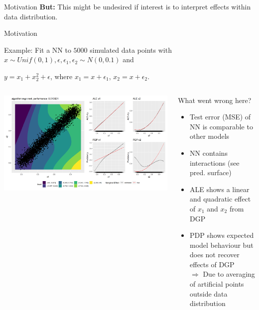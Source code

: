 \documentclass[11pt,compress,t,notes=noshow, aspectratio=169, xcolor=table]{beamer}
\begin{document}
\begin{frame}{Motivation}
\textbf{But:} This might be undesired if interest is to interpret effects within data distribution.



\end{frame}


\begin{frame}{Motivation}


Example: Fit a NN to $5000$ simulated data points with $x \sim Unif(0,1), \epsilon, \epsilon_1, \epsilon_2 \sim N(0, 0.1)$ and

\centerline{$y = x_1 + x_2^2 + \epsilon$, where
$x_1 = x + \epsilon_1$, 
$x_2 = x + \epsilon_2$.}

\begin{columns}[T]
\begin{column}{0.65\textwidth}
\centering
\includegraphics[width=\textwidth]{figure/ale_vs_pdp}
\end{column}
\begin{column}{0.35\textwidth}
What went wrong here?

\begin{itemize}
\item Test error (MSE) of NN is comparable to other models
\item NN contains interactions (see pred. surface)
\item ALE shows a linear and quadratic effect of $x_1$ and $x_2$ from DGP
\item PDP shows expected model behaviour but does not recover effects of DGP \\
$\Rightarrow$ Due to averaging of artificial points outside data distribution
\end{itemize}

\end{column}
\end{columns}

\end{frame}
\end{document}
